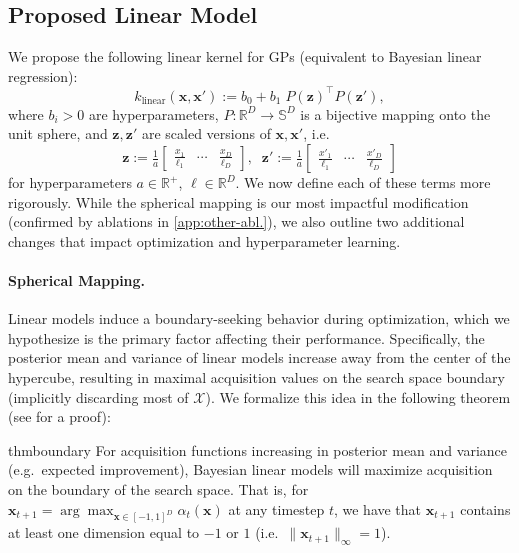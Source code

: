 \documentclass[twoside]{article}
\theoremstyle{plain}
\theoremstyle{definition}
\begin{document}
\subsection{Proposed Linear Model} \label{sec:prop-lin-model}
We propose the following linear kernel for GPs (equivalent to Bayesian linear regression): 
\begin{equation} \label{eq:lin-kernel}
    k_\textrm{linear}\left(\mathbf{x}, \mathbf{x'}\right) := b_0 + b_1 \; P\left(\mathbf{z}\right)^{\top} P\left(\mathbf{z'}\right),
\end{equation}
where $b_i > 0$ are hyperparameters, $P: \mathbb{R}^D \rightarrow \mathbb{S}^D$ is a bijective mapping onto the unit sphere, and $\mathbf{z},\mathbf{z'}$ are scaled versions of $\mathbf{x}, \mathbf{x'}$, i.e.\ 
\begin{equation} \label{eq:glob-l}
    \mathbf{z} := \tfrac{1}{a} \begin{bmatrix} \tfrac{x_1}{\ell_1} & \cdots  & \tfrac{x_D}{\ell_D} \end{bmatrix}, \; \; \mathbf{z'} := \tfrac{1}{a} \begin{bmatrix} \tfrac{x'_1}{\ell_1} & \cdots  & \tfrac{x'_D}{\ell_D} \end{bmatrix}
\end{equation}
for hyperparameters $a \in \mathbb R^+$, $\boldsymbol \ell \in \mathbb R^D$.
We now define each of these terms more rigorously. While the spherical mapping is our most impactful modification (confirmed by ablations in \cref{app:other-abl.}), we also outline two additional changes that impact optimization and hyperparameter learning.

\paragraph{Spherical Mapping.}
Linear models induce a boundary-seeking behavior during optimization,
which we hypothesize is the primary factor affecting their performance.
Specifically, the posterior mean and variance of linear models increase away from the center of the hypercube, resulting in maximal acquisition values on the search space boundary (implicitly discarding most of $\mathcal X$). We formalize this idea in the following theorem
(see \Cref{app:boundary} for a proof):

\begin{restatable}{thm}{boundary} \label{thm:boundary}
    For acquisition functions increasing in posterior mean and variance (e.g.\ expected improvement), Bayesian linear models will maximize acquisition on the boundary of the search space. That is, for $\mathbf{x}_{t+1} = \arg \max_{\mathbf{x} \in [-1, 1]^D} \alpha_t(\mathbf{x})$ at any timestep $t$, we have that $\mathbf{x}_{t+1}$ contains at least one dimension equal to $-1$ or $1$ (i.e.\ $\|\mathbf{x}_{t+1}\|_\infty = 1$).
\end{restatable}
\end{document}
